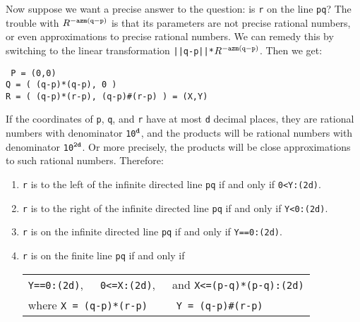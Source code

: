 \documentclass[12pt]{article}
\begin{document}
Now suppose we want a precise answer to the question: is {\tt r}
on the line {\tt pq}?  The trouble with 
$R^{\tt -azm(q-p)}$ is that its parameters are not precise rational
numbers, or even approximations to precise rational numbers.
We can remedy this by switching to the linear transformation
{\tt ||q-p||*$R^{\tt -azm(q-p)}$}.  Then we get:
\begin{center} \tt
P = (0,0) \\
Q = ( (q-p)*(q-p), 0 ) \\
R = ( (q-p)*(r-p), (q-p)\#(r-p) ) = (X,Y)
\end{center}
If the coordinates of {\tt p}, {\tt q}, and {\tt r} have at
most {\tt d} decimal places, they are rational numbers with
denominator {\tt 10$^{\tt d}$}, and the products will be rational
numbers with denominator {\tt 10$^{\tt 2d}$}.  Or more precisely,
the products will be close approximations to such rational numbers.
Therefore:
\begin{enumerate}
\item {\tt r} is to the left of the infinite directed line {\tt pq}
if and only if {\tt 0<Y:(2d)}.
\item {\tt r} is to the right of the infinite directed line {\tt pq}
if and only if {\tt Y<0:(2d)}.
\item {\tt r} is on the infinite directed line {\tt pq}
if and only if {\tt Y==0:(2d)}.
\item {\tt r} is on the finite line {\tt pq} if and only if \\
\hspace*{0.3in}\begin{tabular}[t]{@{}l}
               {\tt Y==0:(2d)},~~~{\tt 0<=X:(2d)},~~~and
	           {\tt X<=(p-q)*(p-q):(2d)} \\
	       where {\tt X = (q-p)*(r-p) ~~~ Y = (q-p)\#(r-p)} \\
	       \end{tabular}
\end{enumerate}

\newpage
\end{document}
